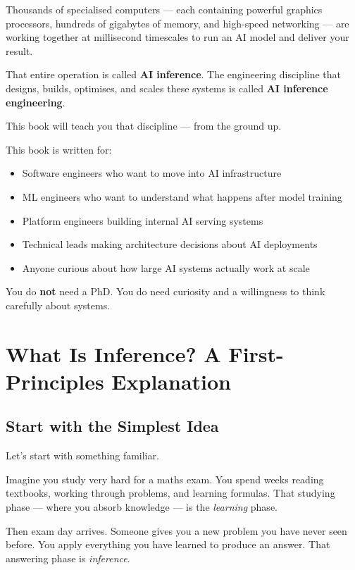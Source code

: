 \documentclass[12pt, twoside, openright]{book}
\newcommand{\term}[1]{\textbf{\color{chaptercolor}#1}}
\begin{document}
Thousands of specialised computers --- each containing powerful graphics
processors, hundreds of gigabytes of memory, and high-speed networking ---
are working together at millisecond timescales to run an AI model and
deliver your result.

That entire operation is called \term{AI inference}. The engineering
discipline that designs, builds, optimises, and scales these systems is
called \term{AI inference engineering}.

This book will teach you that discipline --- from the ground up.

\begin{notebox}
This book is written for:
\begin{itemize}
  \item Software engineers who want to move into AI infrastructure
  \item ML engineers who want to understand what happens after model
        training
  \item Platform engineers building internal AI serving systems
  \item Technical leads making architecture decisions about AI deployments
  \item Anyone curious about how large AI systems actually work at scale
\end{itemize}
You do \textbf{not} need a PhD. You do need curiosity and a willingness
to think carefully about systems.
\end{notebox}

\section{What Is Inference? A First-Principles Explanation}

\subsection{Start with the Simplest Idea}

Let's start with something familiar.

Imagine you study very hard for a maths exam.
You spend weeks reading textbooks, working through problems,
and learning formulas.
That studying phase --- where you absorb knowledge --- is the
\textit{learning} phase.

Then exam day arrives.
Someone gives you a new problem you have never seen before.
You apply everything you have learned to produce an answer.
That answering phase is \textit{inference}.
\end{document}
